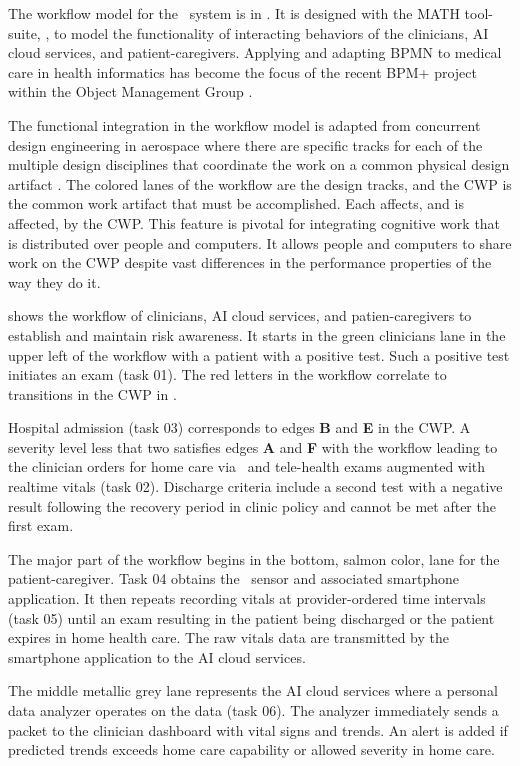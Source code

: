 The workflow model for the \phware\ system is in . It is designed with the MATH tool-suite, \cite{workflowmodel}, to model the functionality of interacting behaviors of the clinicians, AI cloud services, and patient-caregivers. Applying and adapting BPMN to medical care in health informatics has become the focus of the recent BPM+ project within the Object Management Group \cite{bpm}. 

The functional integration in the workflow model is adapted from concurrent design engineering in aerospace where there are specific tracks for each of the multiple design disciplines that coordinate the work on a common physical design artifact \cite{10.1007/978-1-4471-1538-0_9}. The colored lanes of the workflow are the design tracks, and the CWP is the common work artifact that must be accomplished. Each affects, and is affected, by the CWP. This feature is pivotal for integrating cognitive work that is distributed over people and computers. It allows people and computers to share work on the CWP despite vast differences in the performance properties of the way they do it. 

 shows the workflow of clinicians, AI cloud services, and patien-caregivers to establish and maintain risk awareness. It starts in the green clinicians lane in the upper left of the workflow with a patient with a positive test. Such a positive test initiates an exam (task 01). The red letters in the workflow correlate to transitions in the CWP in . 

Hospital admission (task 03) corresponds to edges \textbf{B} and \textbf{E} in the CWP. A severity level less that two satisfies edges \textbf{A} and \textbf{F} with the workflow leading to the clinician orders for home care via \phware\ and tele-health exams augmented with realtime vitals (task 02). Discharge criteria include a second test with a negative result following the recovery period in clinic policy and cannot be met after the first exam.

The major part of the workflow begins in the bottom, salmon color, lane for the patient-caregiver. Task 04 obtains the \phware\ sensor and associated smartphone application. It then repeats recording vitals at provider-ordered time intervals (task 05) until an exam resulting in the patient being discharged or the patient expires in home health care. The raw vitals data are transmitted by the smartphone application to the AI cloud services. 

The middle metallic grey lane represents the AI cloud services where a personal data analyzer operates on the data (task 06).  The analyzer immediately sends a packet to the clinician dashboard with vital signs and trends. An alert is added if predicted trends exceeds home care capability or allowed severity in home care.

